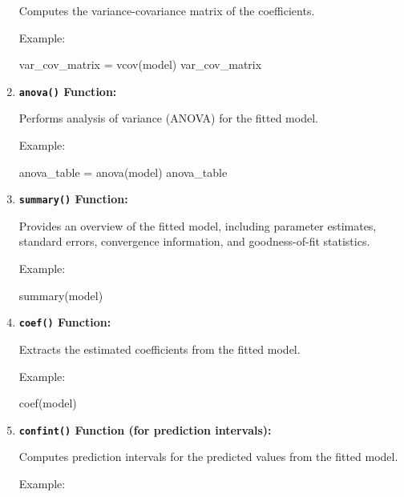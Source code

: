 \documentclass[
]{article}
\newenvironment{Shaded}{}{}
\newcommand{\FunctionTok}[1]{\textcolor[rgb]{0.02,0.16,0.49}{#1}}
\newcommand{\NormalTok}[1]{#1}
\newcommand{\OtherTok}[1]{\textcolor[rgb]{0.00,0.44,0.13}{#1}}
\begin{document}
\begin{enumerate}
  Computes the variance-covariance matrix of the coefficients.

  Example:

\begin{Shaded}
\begin{Highlighting}[]
\NormalTok{var\_cov\_matrix }\OtherTok{=} \FunctionTok{vcov}\NormalTok{(model)}
\NormalTok{var\_cov\_matrix}
\end{Highlighting}
\end{Shaded}
\item
  \textbf{\texttt{anova()} Function:}

  Performs analysis of variance (ANOVA) for the fitted model.

  Example:

\begin{Shaded}
\begin{Highlighting}[]
\NormalTok{anova\_table }\OtherTok{=} \FunctionTok{anova}\NormalTok{(model)}
\NormalTok{anova\_table}
\end{Highlighting}
\end{Shaded}
\item
  \textbf{\texttt{summary()} Function:}

  Provides an overview of the fitted model, including parameter
  estimates, standard errors, convergence information, and
  goodness-of-fit statistics.

  Example:

\begin{Shaded}
\begin{Highlighting}[]
\FunctionTok{summary}\NormalTok{(model)}
\end{Highlighting}
\end{Shaded}
\item
  \textbf{\texttt{coef()} Function:}

  Extracts the estimated coefficients from the fitted model.

  Example:

\begin{Shaded}
\begin{Highlighting}[]
\FunctionTok{coef}\NormalTok{(model)}
\end{Highlighting}
\end{Shaded}
\item
  \textbf{\texttt{confint()} Function (for prediction intervals):}

  Computes prediction intervals for the predicted values from the fitted
  model.

  Example:


\end{enumerate}
\end{document}
